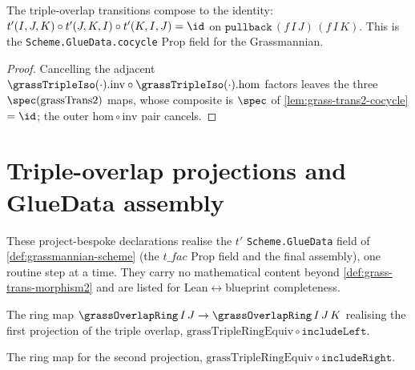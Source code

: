 \begin{lemma}

  \label{lem:grass-trans-morphism2-cocycle}
  The triple-overlap transitions compose to the identity:
  $t'(I,J,K)\circ t'(J,K,I)\circ t'(K,I,J)=\id$ on
  $\mathtt{pullback}\,(f\,I\,J)\,(f\,I\,K)$. This is the
  \texttt{Scheme.GlueData.cocycle} Prop field for the Grassmannian.
\end{lemma}
\begin{proof}
  Cancelling the adjacent $\grassTripleIso(\cdot).\mathrm{inv}\circ
  \grassTripleIso(\cdot).\mathrm{hom}$ factors leaves the three $\spec(\mathrm{grassTrans2})$
  maps, whose composite is $\spec$ of \cref{lem:grass-trans2-cocycle} $=\id$; the
  outer $\mathrm{hom}\circ\mathrm{inv}$ pair cancels.
\end{proof}

\section{Triple-overlap projections and GlueData assembly}

These project-bespoke declarations realise the $t'$ \texttt{Scheme.GlueData} field
of \cref{def:grassmannian-scheme} (the $t\_fac$ Prop field and the final
assembly), one routine step at a time. They carry no mathematical content beyond
\cref{def:grass-trans-morphism2} and are listed for Lean$\leftrightarrow$blueprint
completeness.

\begin{definition}

  \label{def:grass-triple-proj-fst}
  The ring map $\grassOverlapRing\,I\,J\to\grassOverlapRing\,I\,J\,K$ realising the
  first projection of the triple overlap, $\mathrm{grassTripleRingEquiv}\circ
  \mathtt{includeLeft}$.
\end{definition}

\begin{definition}

  \label{def:grass-triple-proj-snd}
  The ring map for the second projection, $\mathrm{grassTripleRingEquiv}\circ
  \mathtt{includeRight}$.
\end{definition}

